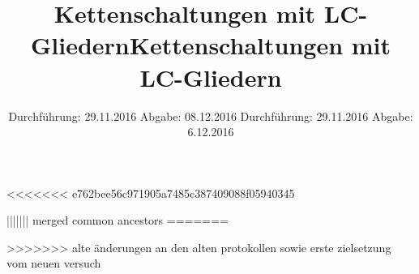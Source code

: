 <<<<<<< e762bee56c971905a7485c387409088f05940345


\subject{V356}
\title{Kettenschaltungen mit LC-Gliedern}
\date{
	Durchführung: 29.11.2016
	\hspace{4em}
	Abgabe: 08.12.2016
}


	\maketitle
	\newpage
	\tableofcontents
	\newpage
	
	
	
	
	
	\newpage
	
	\printbibliography

||||||| merged common ancestors
=======


\subject{V354}
\title{Kettenschaltungen mit LC-Gliedern}
\date{
	Durchführung: 29.11.2016
	\hspace{4em}
	Abgabe: 6.12.2016
}


	\maketitle
	\newpage
	\tableofcontents
	\newpage
	
	
	
	
	
	\newpage
	
	\printbibliography

>>>>>>> alte änderungen an den alten protokollen sowie erste zielsetzung vom neuen versuch
